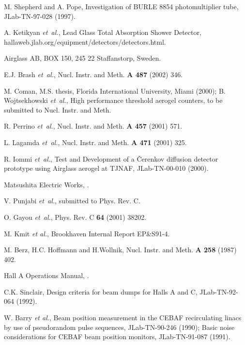 \begin{thebibliography}{99}
 M. Shepherd and A. Pope,
\newblock Investigation of BURLE 8854 photomultiplier tube,
JLab-TN-97-028 (1997). 

 A. Ketikyan {\em et~al.},
\newblock Lead Glass Total Absorption Shower Detector, hallaweb.jlab.org/equipment/detectors/detectors.html.

 Airglass AB,
\newblock BOX 150, 245 22 Staffanstorp, Sweden. 

 E.J. Brash {\em et~al.},
\newblock Nucl. Instr. and Meth. {\bf A 487} (2002) 346.

 M. Coman,
\newblock M.S. thesis, Florida International University,
Miami (2000);  B. Wojtsekhowski {\em et~al.}, High performance 
threshold aerogel counters, to be submitted to Nucl. Instr. and Meth.

 R. Perrino {\em et~al.}, 
\newblock Nucl. Instr. and Meth. {\bf A 457} (2001) 571.

 L. Lagamda {\em et~al.},
\newblock Nucl. Instr. and Meth. {\bf A 471} (2001) 325.

 R. Iommi {\em et~al.},
\newblock Test and Development of a \v{C}erenkov diffusion detector 
prototype using Airglass aerogel at TJNAF, JLab-TN-00-010 (2000).


 Matsushita Electric Works,
.

 V. Punjabi {\em et~al.},
\newblock submitted to Phys. Rev. C.

 O. Gayou {\em et~al.},
\newblock Phys. Rev. C {\bf 64} (2001) 38202.

 M. Kmit {\em et al.},
\newblock Brookhaven Internal Report EP{\&}S91-4.

 M. Berz, H.C. Hoffmann and H.Wollnik,
\newblock Nucl. Instr. and Meth. {\bf A 258} (1987) 402.

 Hall A Operations Manual,
.

 C.K. Sinclair,
\newblock Design criteria for beam dumps for Halls A and C, JLab-TN-92-064 (1992).

 W. Barry {\em et al.},
\newblock Beam position measurement in 
the CEBAF recirculating linacs by use of pseudorandom pulse sequences, 
JLab-TN-90-246 (1990); 
Basic noise considerations for CEBAF beam position monitors, 
JLab-TN-91-087 (1991).


\end{thebibliography}

